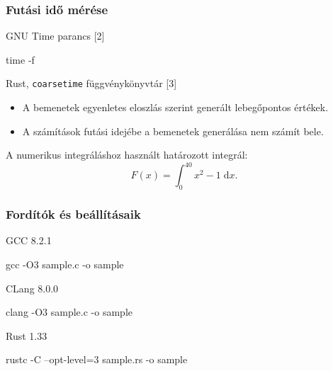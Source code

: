 \documentclass{beamer}
\begin{document}
\begin{frame}[fragile]
\frametitle{Futási idő mérése}

GNU Time parancs [2]
\begin{cpp}
time -f %
\end{cpp}

\medskip

Rust, \texttt{coarsetime} függvénykönyvtár [3]

\medskip

\begin{itemize}
\item A bemenetek egyenletes eloszlás szerint generált lebegőpontos értékek.
\item A számítások futási idejébe a bemenetek generálása nem számít bele.
\end{itemize}

\medskip

A numerikus integráláshoz használt határozott integrál:
\[
F(x) = \int_0^{40} \! x^2 - 1 \; \mathrm{d}x.
\]

\end{frame}

\begin{frame}[fragile]
\frametitle{Fordítók és beállításaik}

GCC 8.2.1

\begin{cpp}
gcc -O3 sample.c -o sample
\end{cpp}

\medskip

CLang 8.0.0

\begin{cpp}
clang -O3 sample.c -o sample
\end{cpp}

\medskip

Rust 1.33
\begin{cpp}
rustc -C --opt-level=3 sample.rs -o sample
\end{cpp}

\end{frame}
\end{document}
